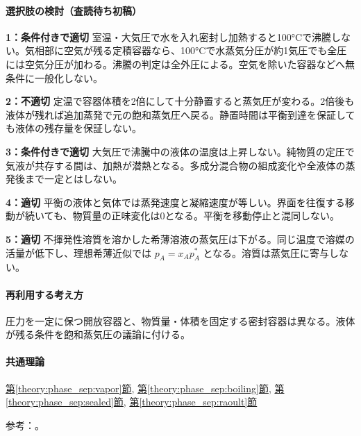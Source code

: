 \paragraph{選択肢の検討（査読待ち初稿）}\mbox{}\par

\noindent\textbf{1：条件付きで適切} 室温・大気圧で水を入れ密封し加熱すると100°Cで沸騰しない。気相部に空気が残る定積容器なら、100°Cで水蒸気分圧が約1気圧でも全圧には空気分圧が加わる。沸騰の判定は全外圧による。空気を除いた容器などへ無条件に一般化しない。\par

\noindent\textbf{2：不適切} 定温で容器体積を2倍にして十分静置すると蒸気圧が変わる。2倍後も液体が残れば追加蒸発で元の飽和蒸気圧へ戻る。静置時間は平衡到達を保証しても液体の残存量を保証しない。\par

\noindent\textbf{3：条件付きで適切} 大気圧で沸騰中の液体の温度は上昇しない。純物質の定圧で気液が共存する間は、加熱が潜熱となる。多成分混合物の組成変化や全液体の蒸発後まで一定とはしない。\par

\noindent\textbf{4：適切} 平衡の液体と気体では蒸発速度と凝縮速度が等しい。界面を往復する移動が続いても、物質量の正味変化は0となる。平衡を移動停止と混同しない。\par

\noindent\textbf{5：適切} 不揮発性溶質を溶かした希薄溶液の蒸気圧は下がる。同じ温度で溶媒の活量が低下し、理想希薄近似では \(p_A=x_Ap_A^*\) となる。溶質は蒸気圧に寄与しない。\par

\paragraph{再利用する考え方} 圧力を一定に保つ開放容器と、物質量・体積を固定する密封容器は異なる。液体が残る条件を飽和蒸気圧の議論に付ける。

\paragraph{共通理論} \hyperref[theory:phase_sep:vapor]{第\ref*{theory:phase_sep:vapor}節}, \hyperref[theory:phase_sep:boiling]{第\ref*{theory:phase_sep:boiling}節}, \hyperref[theory:phase_sep:sealed]{第\ref*{theory:phase_sep:sealed}節}, \hyperref[theory:phase_sep:raoult]{第\ref*{theory:phase_sep:raoult}節}

\par 参考：\cite{mit_solutions2008,mit_clapeyron2008}。

